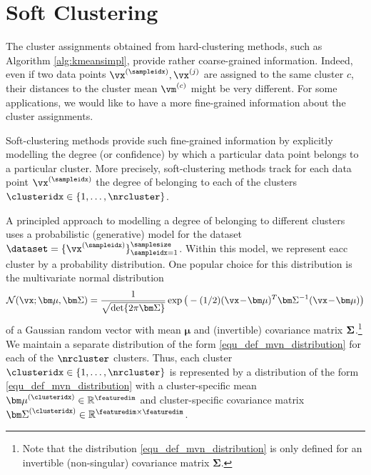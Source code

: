 \documentclass[12pt]{report}
\begin{document}
\section{Soft Clustering}
\label{sec_soft_clustering}

The cluster assignments obtained from hard-clustering methods, such as Algorithm \ref{alg:kmeansimpl}, provide 
rather coarse-grained information. Indeed, even if two data points $\vx^{(\sampleidx)}, \vx^{(j)}$ are assigned to the 
same cluster $c$, their distances to the cluster mean $\vm^{(c)}$ might be very different. For some applications, we 
would like to have a more fine-grained information about the cluster assignments. 

Soft-clustering methods provide such fine-grained information by explicitly modelling the degree (or confidence) by which 
a particular data point belongs to a particular cluster. More precisely, soft-clustering methods track for each data 
point $\vx^{(\sampleidx)}$ the degree of belonging to each of the clusters $\clusteridx \in \{1,\ldots,\nrcluster\}$.  

A principled approach to modelling a degree of belonging to different clusters uses a probabilistic (generative) model for 
the dataset $\dataset = \{ \vx^{(\sampleidx)} \}_{\sampleidx=1}^{\samplesize}$. Within this model, we represent %
eacc cluster by a probability distribution. 
One popular choice for this distribution is the multivariate normal distribution 
\begin{equation}
\label{equ_def_mvn_distribution}
 \mathcal{N} (\vx ; {\bm \mu}, {\bm \Sigma}) = \frac{1}{\sqrt{{\rm det } \{ 2 \pi  {\bm \Sigma} \} }} \exp\big( - (1/2) (\vx\!-\!{\bm \mu})^{T}  {\bm \Sigma}^{-1} (\vx\!-\!{\bm \mu})  \big)
\end{equation} 
of a Gaussian random vector with mean ${\bm \mu}$ and (invertible) covariance matrix ${\bf \Sigma}$.\footnote{Note that the distribution \eqref{equ_def_mvn_distribution} 
is only defined for an invertible (non-singular) covariance matrix ${\bm \Sigma}$.}
We maintain a separate distribution of the form \eqref{equ_def_mvn_distribution} for each of the $\nrcluster$ clusters. 
Thus, each cluster $\clusteridx \in \{1,\ldots,\nrcluster\}$ is represented by a distribution of the form \eqref{equ_def_mvn_distribution} 
with a cluster-specific mean ${\bm \mu}^{(\clusteridx)} \in \mathbb{R}^{\featuredim}$ and cluster-specific covariance matrix ${\bm \Sigma}^{(\clusteridx)} \in \mathbb{R}^{\featuredim \times \featuredim}$. 
\end{document}
